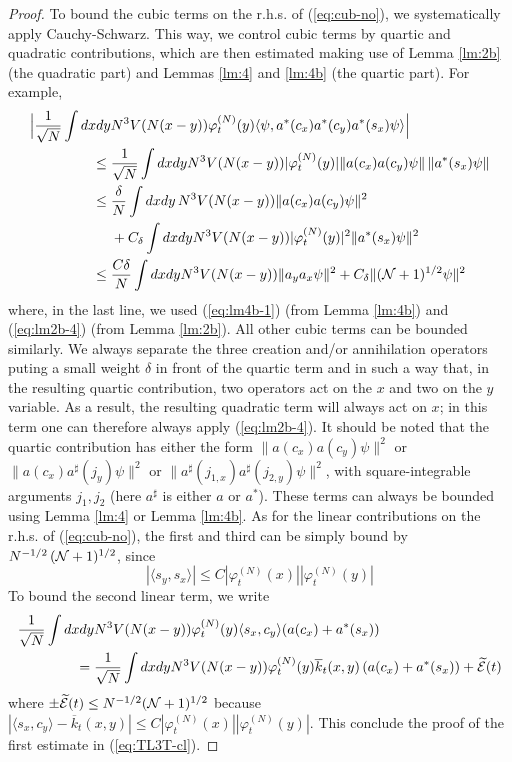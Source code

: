 \documentclass[11pt,a4paper]{article}
\newcommand{\wt}{\widetilde}
\newcommand{\cE}{{\cal E}}
\newcommand{\cN}{{\cal N}}
\begin{document}
\begin{proof}
To bound the cubic terms on the r.h.s. of (\ref{eq:cub-no}), we systematically apply Cauchy-Schwarz.
This way, we control cubic terms by quartic and quadratic contributions, which are then estimated making use of Lemma \ref{lm:2b} (the quadratic part) and Lemmas \ref{lm:4} and \ref{lm:4b} (the quartic part). For example,
\[ \begin{split} \Big| \frac{1}{\sqrt{N}}\int dx dy &N^3 V(N(x-y)) \varphi_t^{(N)} (y) \langle  \psi , a^* (c_x) a^* (c_y) a^* (s_x) \psi \rangle \Big| \\ \leq \; &  \frac{1}{\sqrt{N}} \int dx dy N^3 V (N (x-y)) |\varphi_t^{(N)} (y)|  \| a (c_x) a (c_y) \psi \| \, \| a^* (s_x) \psi \| \\ \leq \; & \frac{\delta}{N}  \int dx dy \, N^3 V (N (x-y)) \| a (c_x) a(c_y) \psi \|^2 \\ &+ C_\delta\int dx dy N^3 V (N (x-y)) |\varphi_t^{(N)} (y)|^2 \| a^* (s_x)  \psi \|^2 \\ \leq \; & \frac{C \delta}{N} \int dx dy N^3 V(N (x-y)) \| a_y a_x \psi \|^2 + C_\delta  \| (\cN + 1)^{1/2}  \psi \|^2  \end{split} \]
where, in the last line, we used (\ref{eq:lm4b-1}) (from Lemma \ref{lm:4b}) and (\ref{eq:lm2b-4}) (from Lemma \ref{lm:2b}). All other cubic terms can be bounded similarly. We always separate the three creation and/or annihilation operators puting a small weight $\delta$ in front of the quartic term and
in such a way that, in the resulting quartic contribution, two operators act on the $x$ and two on the $y$ variable. As a result, the resulting quadratic term will always act on $x$; in this term one can therefore always apply (\ref{eq:lm2b-4}). It should be noted that the quartic contribution has either the form $\| a (c_x) a (c_y) \psi \|^2$ or $\| a (c_x) a^\sharp (j_y) \psi \|^2$ or $\| a^\sharp (j_{1,x}) a^\sharp (j_{2,y}) \psi \|^2$, with square-integrable arguments $j_1, j_2$ (here $a^\sharp$ is either $a$ or $a^*$). These terms can always be bounded using Lemma \ref{lm:4} or Lemma \ref{lm:4b}. As for the linear contributions on the r.h.s. of (\ref{eq:cub-no}), the first and third can be simply bound by $N^{-1/2} \, (\cN+1)^{1/2}$, since 
\[ |\langle s_y , s_x \rangle| \leq C |\varphi^{(N)}_t (x)| |\varphi^{(N)}_t (y)| \]
To bound the second linear term, we write 
\[ \begin{split} 
\frac{1}{\sqrt{N}} \int dx dy & N^3 V(N (x-y)) \varphi_t^{(N)} (y) \langle s_x, c_y \rangle (a(c_x) + a^* (s_x))  \\ = \; & \frac{1}{\sqrt{N}} \int dx dy  N^3 V(N (x-y)) \varphi_t^{(N)} (y) \overline{k}_t (x,y) \, (a(c_x) + a^* (s_x)) + \wt{\cE} (t) \end{split} \]
where $\pm \wt{\cE} (t) \leq N^{-1/2} (\cN+1)^{1/2}$ because $|\langle s_x , c_y \rangle - \overline{k}_t (x,y)| \leq C |\varphi_t^{(N)} (x)| |\varphi_t^{(N)} (y)|$. This conclude the proof of the first estimate in (\ref{eq:TL3T-cl}). 


\end{proof}
\end{document}
